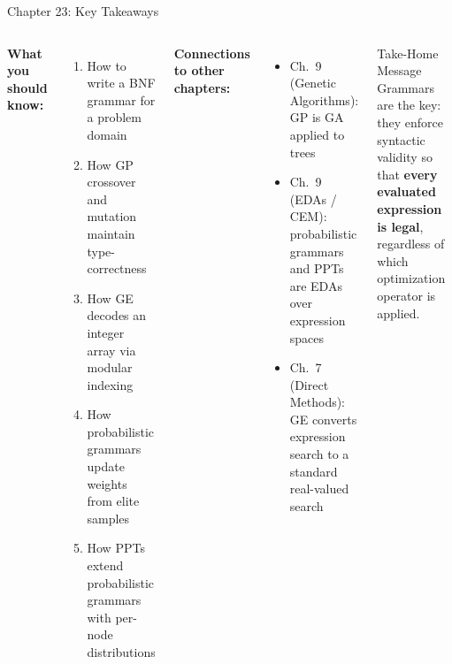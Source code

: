 \documentclass[aspectratio=169,10pt]{beamer}
\begin{document}
\begin{frame}{Chapter 23: Key Takeaways}
  \begin{columns}[T]
    \textbf{What you should know:}
    \begin{enumerate}
      \item How to write a BNF grammar for a problem domain
      \item How GP crossover and mutation maintain type-correctness
      \item How GE decodes an integer array via modular indexing
      \item How probabilistic grammars update weights from elite samples
      \item How PPTs extend probabilistic grammars with per-node distributions
    \end{enumerate}
    \textbf{Connections to other chapters:}
    \begin{itemize}
      \item Ch.\ 9 (Genetic Algorithms): GP is GA applied to trees
      \item Ch.\ 9 (EDAs / CEM): probabilistic grammars and PPTs are EDAs over expression spaces
      \item Ch.\ 7 (Direct Methods): GE converts expression search to a standard real-valued search
    \end{itemize}
    \medskip
    \begin{block}{Take-Home Message}
      Grammars are the key: they enforce syntactic validity
      so that \textbf{every evaluated expression is legal},
      regardless of which optimization operator is applied.
    \end{block}
  \end{columns}
\end{frame}
\end{document}

